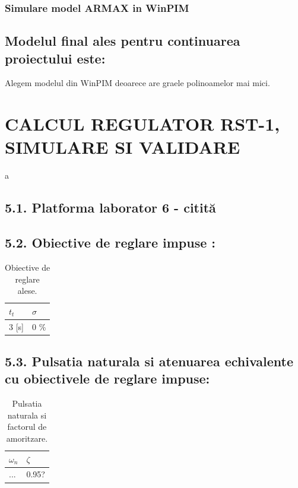 \documentclass[12pt,english]{article}
\begin{document}
\subsubsection {Simulare model ARMAX in WinPIM }
\begin{center}
\end{center}
\subsection {Modelul final ales pentru continuarea proiectului este: }
Alegem modelul din WinPIM deoarece are graele polinoamelor mai mici.

\section {CALCUL REGULATOR RST-1, SIMULARE SI VALIDARE }
a
\subsection {5.1. Platforma laborator 6 - citită }
\subsection {5.2.  Obiective de reglare impuse  : }

\begin{table}[H]
  \centering
    \begin{tabular}{|l|l|}
      \hline
      $t_t$ & $\sigma$ \\
      \hline
      3 [s] & 0 \% \\
      \hline
    \end{tabular}
    \caption{Obiective de reglare alese.}
\end{table}

\subsection {5.3. Pulsatia naturala si atenuarea echivalente cu obiectivele de reglare impuse: }
\begin{table}[H]
  \centering
    \begin{tabular}{|l|l|}
      \hline
      $\omega_n$ & $\zeta$ \\
      \hline
      ... & 0.95? \\
      \hline
    \end{tabular}
    \caption{Pulsatia naturala si factorul de amoritzare.}
\end{table}
\end{document}

